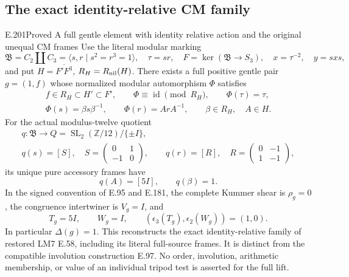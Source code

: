 \subsection{The exact identity-relative CM family}

\begin{result}{E.201}{Proved}
{A full gentle element with identity relative action and the original unequal CM frames}
Use the literal modular marking
\[
 \mathfrak B=C_2\amalg C_3=\langle s,r\mid s^2=r^3=1\rangle,
 \quad \tau=sr,\quad
 F=\ker(\mathfrak B\to S_3),\quad
 x=\tau^{-2},\quad y=sxs,
\]
and put \(H=\overline{F'F^3}\), \(R_H=R_{\rm nil}(H)\).
There exists a full positive gentle pair \(g=(1,f)\) whose
normalized modular automorphism \(\Phi\) satisfies
\[
 \begin{gathered}
 f\in R_H\subset H'\subset F',\qquad
 \Phi\equiv\operatorname{id}\pmod {R_H},\qquad
 \Phi(\tau)=\tau,\\
 \Phi(s)=\beta s\beta^{-1},\qquad
 \Phi(r)=ArA^{-1},\qquad
 \beta\in R_H,\quad A\in H.
 \end{gathered}
\tag{E.201.1}
\]
For the actual modulus-twelve quotient
\[
 \begin{gathered}
 q:\mathfrak B\longrightarrow
 Q=\operatorname{SL}_2(\mathbb Z/12)/\{\pm I\},\\
 q(s)=[S],\quad S=\begin{pmatrix}0&1\\-1&0\end{pmatrix},
 \qquad
 q(r)=[R],\quad R=\begin{pmatrix}0&-1\\1&-1\end{pmatrix},
 \end{gathered}
\tag{E.201.2}
\]
its unique pure accessory frames have
\[
                    q(A)=[5I],\qquad q(\beta)=1.
\tag{E.201.3}
\]
In the signed convention of E.95 and E.181, the complete
Kummer shear is \(\rho_g=0\), the congruence intertwiner is
\(V_g=I\), and
\[
                  T_g=5I,\qquad W_g=I,
                  \qquad (\epsilon_3(T_g),\epsilon_2(W_g))=(1,0).
\tag{E.201.4}
\]
In particular \(\Delta(g)=1\).  This reconstructs the exact
identity-relative family of restored LM7 E.58, including its
literal full-source frames.  It is distinct from the compatible
involution construction E.97.  No order, involution, arithmetic
membership, or value of an individual tripod test is asserted
for the full lift.
\end{result}

